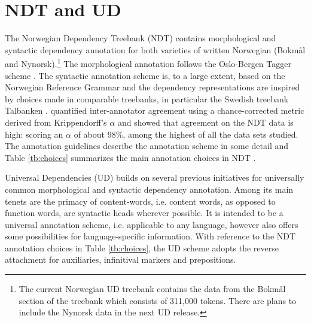 \documentclass[10pt, a4paper]{article}
\begin{document}
\section{NDT and UD}
The Norwegian Dependency Treebank (NDT) \cite{Sol:Skj:Ovr:14} contains
morphological and syntactic dependency annotation for both varieties
of written Norwegian (Bokm{\aa}l and Nynorsk).\footnote{The current
  Norwegian UD treebank contains the data from the Bokmål section of
  the treebank which consists of 311,000 tokens. There are plans to
  include the Nynorsk data in the next UD release.} The morphological
annotation follows the Oslo-Bergen Tagger scheme
\cite{Hag:Joh:Nok:00}.  The syntactic annotation scheme is, to a large
extent, based on the Norwegian Reference Grammar
\cite{Faa:Lie:Van:97} and the dependency representations are
inspired by choices made in comparable treebanks, in particular the
Swedish treebank Talbanken \cite{Niv:Nil:Hal:2006}. 
 quantified inter-annotator agreement using a chance-corrected metric derived from
Krippendorff's $\alpha$ and showed that agreement on the NDT data is high: scoring an $\alpha$ of about
98\%, among the highest of all the data sets studied.
The annotation guidelines \cite{Kin:Sol:Eri:2013} describe the annotation scheme in some detail and Table \ref{tb:choices} summarizes the main annotation choices in NDT \cite{Sol:Skj:Ovr:14}.


Universal Dependencies (UD) builds on several previous initiatives for
universally common morphological \cite{Zem:08,Pet:Das:McD:12} and
syntactic dependency \cite{McD:Niv:Qui:13,Ros:Mas:Mar:14}
annotation. Among its main tenets are the primacy of content-words,
i.e. content words, as opposed to function words, are syntactic heads
wherever possible. It is intended to be a universal annotation scheme,
i.e. applicable to any language, however also offers some
possibilities for language-specific information. With reference to the
NDT annotation choices in Table \ref{tb:choices}, the UD scheme adopts
the reverse attachment for auxiliaries, infinitival markers and
prepositions.
\end{document}
